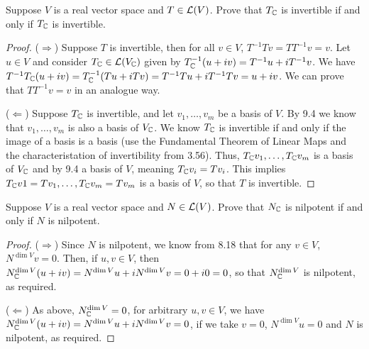 \begin{exercise}{6}
  Suppose $V$ is a real vector space and $T\in\mathcal{L}(V)$. Prove that $T_{\mathbb{C}}$ is invertible if and only if $T_{\mathbb{C}}$ is invertible.
\end{exercise}
\begin{proof}
 ($\Rightarrow$) Suppose $T$ is invertible, then for all $v\in V$, $T^{-1}Tv =TT^{-1}v =v$. Let $u\in V$ and consider $T_{\mathbb{C}}\in\mathcal{L}(V_{\mathbb{C}})$ given by $T_{\mathbb{C}}^{-1}(u+iv) =T^{-1}u+iT^{-1}v$. We have $T^{-1}T_{\mathbb{C}}(u+iv) =T_{\mathbb{C}}^{-1}(Tu +iTv) =T^{-1}Tu +iT^{-1}Tv =u+iv$. We can prove that $TT^{-1}v=v$ in an analogue way.

 ($\Leftarrow$) Suppose $T_{\mathbb{C}}$ is invertible, and let $v_1,\dots,v_m$ be a basis of $V$. By 9.4 we know that $v_1,\dots,v_m$ is also a basis of $V_{\mathbb{C}}$. We know $T_{\mathbb{C}}$ is invertible if and only if the image of a basis is a basis (use the Fundamental Theorem of Linear Maps and the characteristation of invertibility from 3.56). Thus, $T_{\mathbb{C}} v_1,\dots,T_{\mathbb{C}} v_m$ is a basis of $V_{\mathbb{C}}$ and by 9.4 a basis of $V$, meaning $T_{\mathbb{C}} v_i =Tv_i$. This implies $T_{\mathbb{C}} v1=Tv_1,\dots,T_{\mathbb{C}} v_m=Tv_m$ is a basis of $V$, so that $T$ is invertible.
\end{proof}

\begin{exercise}{7}
  Suppose $V$ is a real vector space and $N\in\mathcal{L}(V)$. Prove that $N_{\mathbb{C}}$ is nilpotent if and only if $N$ is nilpotent.
\end{exercise}
\begin{proof}
 ($\Rightarrow$) Since $N$ is nilpotent, we know from 8.18 that for any $v\in V$, $N^{\dim V}v=0$. Then, if $u,v\in V$, then $N_{\mathbb{C}}^{\dim V}(u+iv) =N^{\dim V}u+iN^{\dim V}v =0+i0 =0$, so that $N_{\mathbb{C}}^{\dim V}$ is nilpotent, as required.

 ($\Leftarrow$) As above, $N_{\mathbb{C}}^{\dim V}=0$, for arbitrary $u,v\in V$, we have $N_{\mathbb{C}}^{\dim V}(u+iv) =N^{\dim V}u +iN^{\dim V}v =0$, if we take $v=0$, $N^{\dim V}u=0$ and $N$ is nilpotent, as required.
\end{proof}

